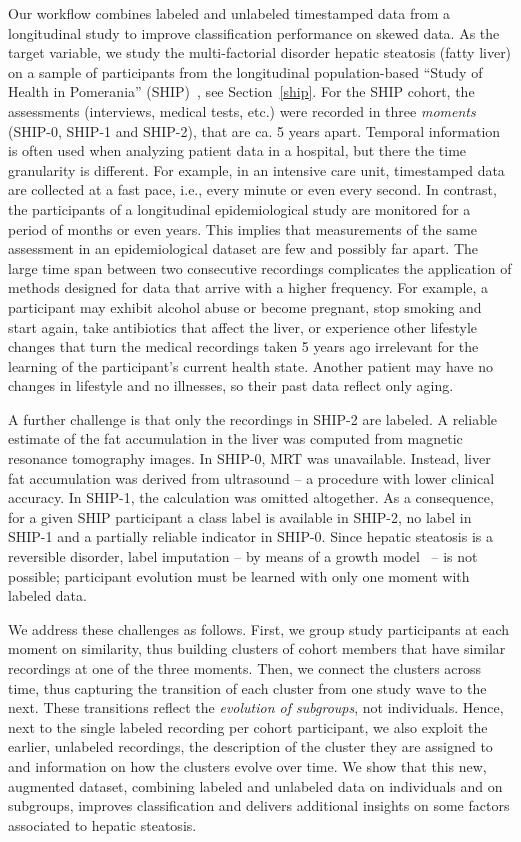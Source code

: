 \documentclass[
  oneside]{book}
\begin{document}
Our workflow combines labeled and unlabeled timestamped data from a longitudinal study to improve classification performance on skewed data.
As the target variable, we study the multi-factorial disorder hepatic steatosis (fatty liver) on a sample of participants from the longitudinal population-based ``Study of Health in Pomerania'' (SHIP)~\autocite{Voelzke:SHIP11}, see Section~\ref{ship}.
For the SHIP cohort, the assessments (interviews, medical tests, etc.) were recorded in three \emph{moments} (SHIP-0, SHIP-1 and SHIP-2), that are ca. 5 years apart.
Temporal information is often used when analyzing patient data in a hospital, but there the time granularity is different.
For example, in an intensive care unit, timestamped data are collected at a fast pace, i.e., every minute or even every second.
In contrast, the participants of a longitudinal epidemiological study are monitored for a period of months or even years.
This implies that measurements of the same assessment in an epidemiological dataset are few and possibly far apart.
The large time span between two consecutive recordings complicates the application of methods designed for data that arrive with a higher frequency.
For example, a participant may exhibit alcohol abuse or become pregnant, stop smoking and start again, take antibiotics that affect the liver, or experience other lifestyle changes that turn the medical recordings taken 5 years ago irrelevant for the learning of the participant's current health state.
Another patient may have no changes in lifestyle and no illnesses, so their past data reflect only aging.

A further challenge is that only the recordings in SHIP-2 are labeled.
A reliable estimate of the fat accumulation in the liver was computed from magnetic resonance tomography images.
In SHIP-0, MRT was unavailable.
Instead, liver fat accumulation was derived from ultrasound -- a procedure with lower clinical accuracy.
In SHIP-1, the calculation was omitted altogether.
As a consequence, for a given SHIP participant a class label is available in SHIP-2, no label in SHIP-1 and a partially reliable indicator in SHIP-0.
Since hepatic steatosis is a reversible disorder, label imputation -- by means of a growth model~\autocite{SingerWillelt03} -- is not possible; participant evolution must be learned with only one moment with labeled data.

We address these challenges as follows.
First, we group study participants at each moment on similarity, thus building clusters of cohort members that have similar recordings at one of the three moments.
Then, we connect the clusters across time, thus capturing the transition of each cluster from one study wave to the next.
These transitions reflect the \emph{evolution of subgroups}, not individuals.
Hence, next to the single labeled recording per cohort participant, we also exploit the earlier, unlabeled recordings, the description of the cluster they are assigned to and information on how the clusters evolve over time.
We show that this new, augmented dataset, combining labeled and unlabeled data on individuals and on subgroups, improves classification and delivers additional insights on some factors associated to hepatic steatosis.
\end{document}
